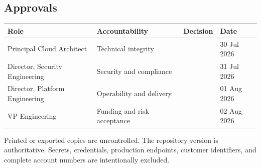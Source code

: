 \subsection*{Approvals}
\begin{tabularx}{\textwidth}{@{}Y L{38mm} C{28mm} C{25mm}@{}}
  \toprule
  \color{white}\textbf{Role} & \color{white}\textbf{Accountability} & \color{white}\textbf{Decision} & \color{white}\textbf{Date} \\
  \midrule
  Principal Cloud Architect & Technical integrity &  & 30 Jul 2026 \\
  Director, Security Engineering & Security and compliance &  & 31 Jul 2026 \\
  Director, Platform Engineering & Operability and delivery &  & 01 Aug 2026 \\
  VP Engineering & Funding and risk acceptance &  & 02 Aug 2026 \\
  \bottomrule
\end{tabularx}

\vfill
\begin{warningbox}
Printed or exported copies are uncontrolled. The repository version is authoritative. Secrets, credentials, production endpoints, customer identifiers, and complete account numbers are intentionally excluded.
\end{warningbox}
\clearpage

\begingroup
\small
\setlength{\parskip}{0pt}
\tableofcontents
\endgroup
\clearpage

